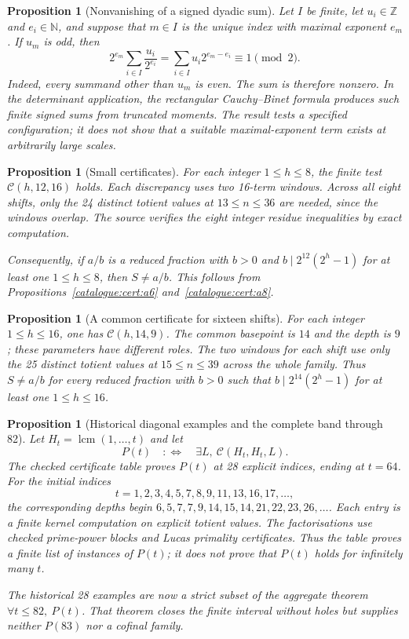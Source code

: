 \documentclass[11pt]{article}
\theoremstyle{plain}
\newtheorem{prop}[thm]{Proposition}
\theoremstyle{definition}
\theoremstyle{remark}
\begin{document}
\begin{prop}[Nonvanishing of a signed dyadic sum]\label{catalogue:mob:d3}
Let $I$ be finite, let $u_i\in\mathbb Z$ and $e_i\in\mathbb N$, and
suppose that $m\in I$ is the unique index with maximal exponent $e_m$.
If $u_m$ is odd, then
\[
 2^{e_m}\sum_{i\in I}\frac{u_i}{2^{e_i}}
       =\sum_{i\in I}u_i2^{e_m-e_i}\equiv1\pmod2.
\]
Indeed, every summand other than $u_m$ is even. The sum is therefore
nonzero. In the determinant application, the rectangular
Cauchy--Binet formula produces such finite signed sums from truncated
moments. The result tests a specified configuration; it does not show
that a suitable maximal-exponent term exists at arbitrarily large scales.
\end{prop}

\begin{prop}[Small certificates]\label{catalogue:cert:a11}
For each integer $1\le h\le8$, the finite test $\mathcal C(h,12,16)$
holds. Each discrepancy uses two 16-term windows. Across all eight
shifts, only the 24 distinct totient values at $13\le n\le36$ are
needed, since the windows overlap. The source verifies the eight
integer residue inequalities by exact computation.

Consequently, if $a/b$ is a reduced fraction with $b>0$ and
$b\mid2^{12}(2^h-1)$ for at least one $1\le h\le8$, then $S\ne a/b$.
This follows from Propositions~\ref{catalogue:cert:a6}
and~\ref{catalogue:cert:a8}.
\end{prop}

\begin{prop}[A common certificate for sixteen shifts]\label{catalogue:cert:a12}
For each integer $1\le h\le16$, one has $\mathcal C(h,14,9)$.
The common basepoint is $14$ and the depth is $9$; these parameters
have different roles. The two windows for each shift use only the
25 distinct totient values at $15\le n\le39$ across the whole family.
Thus $S\ne a/b$ for every reduced fraction with $b>0$ such that
$b\mid2^{14}(2^h-1)$ for at least one $1\le h\le16$.
\end{prop}

\begin{prop}[Historical diagonal examples and the complete band through 82]\label{catalogue:cert:b11}
Let $H_t=\operatorname{lcm}(1,\ldots,t)$ and let
\[
P(t)\quad:\Longleftrightarrow\quad \exists L,\ \mathcal{C}(H_t,H_t,L).
\]
The checked certificate table proves $P(t)$ at 28 explicit indices, ending at $t=64$.
For the initial indices
\[
t=1,2,3,4,5,7,8,9,11,13,16,17,\ldots,
\]
the corresponding depths begin
$6,5,7,7,9,14,15,14,21,22,23,26,\ldots$.
Each entry is a finite kernel computation on explicit totient values. The factorisations use
checked prime-power blocks and Lucas primality certificates. Thus the table proves a finite list
of instances of $P(t)$; it does not prove that $P(t)$ holds for infinitely many $t$.

The historical 28 examples are now a strict subset of the aggregate theorem
$\forall t\le82,\ P(t)$.  That theorem closes the finite interval without
holes but supplies neither $P(83)$ nor a cofinal family.
\end{prop}
\end{document}
